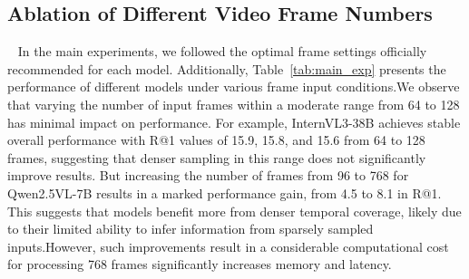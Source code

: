 \documentclass{article}
\begin{document}
\subsection{Ablation of Different Video Frame Numbers}~\label{app:frame_result}
In the main experiments, we followed the optimal frame settings officially recommended for each model. Additionally, Table~\ref{tab:main_exp} presents the performance of different models under various frame input conditions.We observe that varying the number of input frames within a moderate range from 64 to 128 has minimal impact on performance. For example, InternVL3-38B achieves stable overall performance with R@1 values of 15.9, 15.8, and 15.6 from 64 to 128 frames, suggesting that denser sampling in this range does not significantly improve results. But increasing the number of frames from 96 to 768 for Qwen2.5VL-7B results in a marked performance gain, from 4.5 to 8.1 in R@1. This suggests that models benefit more from denser temporal coverage, likely due to their limited ability to infer information from sparsely sampled inputs.However, such improvements result in a considerable computational cost for processing 768 frames significantly increases memory and latency. 
\end{document}

